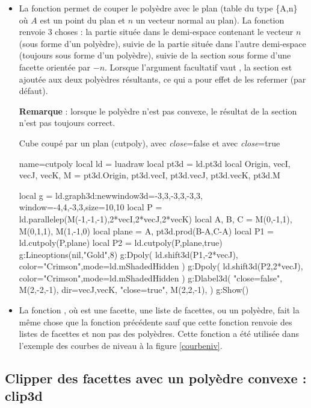 \begin{itemize}
    \item La fonction  permet de couper le polyèdre  avec le plan  (table du type \{A,n\} où $A$ est un point du plan et $n$ un vecteur normal au plan). La fonction renvoie 3 choses : la partie située dans le demi-espace contenant le vecteur $n$ (sous forme d'un polyèdre), suivie de la partie située dans l'autre demi-espace (toujours sous forme d'un polyèdre), suivie de la section sous forme d'une facette orientée par $-n$. Lorsque l'argument facultatif  vaut \true, la section est ajoutée aux deux polyèdres résultants, ce qui a pour effet de les refermer (\false par défaut).\par
    \textbf{Remarque} : lorsque le polyèdre  n'est pas convexe, le résultat de la section n'est pas toujours correct.

\begin{demo}{Cube coupé par un plan (cutpoly), avec \emph{close}=false et avec \emph{close}=true}
\begin{luadraw}{name=cutpoly}
local ld = luadraw
local pt3d = ld.pt3d
local Origin, vecI, vecJ, vecK, M = pt3d.Origin, pt3d.vecI, pt3d.vecJ, pt3d.vecK, pt3d.M

local g = ld.graph3d:new{window3d={-3,3,-3,3,-3,3}, window={-4,4,-3,3},size={10,10}}
local P = ld.parallelep(M(-1,-1,-1),2*vecI,2*vecJ,2*vecK)
local A, B, C = M(0,-1,1), M(0,1,1), M(1,-1,0)
local plane = {A, pt3d.prod(B-A,C-A)}
local P1 = ld.cutpoly(P,plane)
local P2 = ld.cutpoly(P,plane,true)
g:Lineoptions(nil,"Gold",8)
g:Dpoly( ld.shift3d(P1,-2*vecJ), {color="Crimson",mode=ld.mShadedHidden} )
g:Dpoly( ld.shift3d(P2,2*vecJ), {color="Crimson",mode=ld.mShadedHidden} )
g:Dlabel3d(
    "close=false", M(2,-2,-1), {dir={vecJ,vecK}},
    "close=true", M(2,2,-1), {} )
g:Show()
\end{luadraw}
\end{demo}

     \item La fonction , où  est une facette, une liste de facettes, ou un polyèdre, fait la même chose que la fonction précédente sauf que cette fonction renvoie des listes de facettes et non pas des polyèdres. Cette fonction a été utilisée dans l'exemple des courbes de niveau à la figure \ref{courbeniv}.
\end{itemize}

\subsection{Clipper des facettes avec un polyèdre convexe : clip3d}

